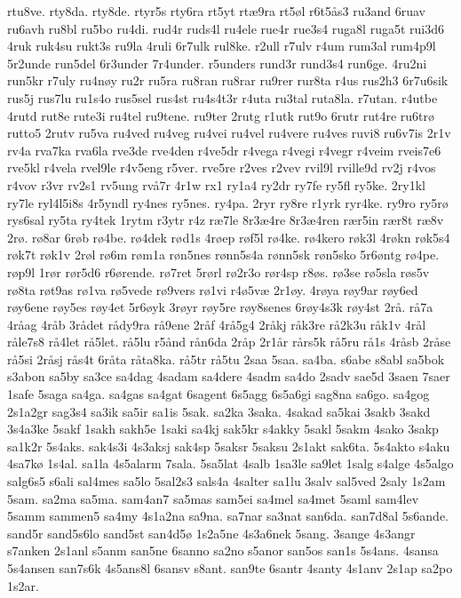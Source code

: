 {rtu8ve.
rty8da.
rty8de.
rtyr5s
rty6ra
rt5yt
rtæ9ra
rt5øl
r6t5ås3
ru3and
6ruav
ru6avh
ru8bl
ru5bo
ru4di.
rud4r
ruds4l
ru4ele
rue4r
rue3s4
ruga8l
ruga5t
rui3d6
4ruk
ruk4su
rukt3s
ru9la
4ruli
6r7ulk
rul8ke.
r2ull
r7ulv
r4um
rum3al
rum4p9l
5r2unde
run5del
6r3under
7r4under.
r5unders
rund3r
rund3s4
run6ge.
4ru2ni
run5kr
r7uly
ru4nøy
ru2r
ru5ra
ru8ran
ru8rar
ru9rer
rur8ta
r4us
rus2h3
6r7u6sik
rus5j
rus7lu
ru1s4o
rus5sel
rus4st
ru4s4t3r
r4uta
ru3tal
ruta8la.
r7utan.
r4utbe
4rutd
rut8e
rute3i
ru4tel
ru9tene.
ru9ter
2rutg
r1utk
rut9o
6rutr
rut4re
ru6trø
rutto5
2rutv
ru5va
ru4ved
ru4veg
ru4vei
ru4vel
ru4vere
ru4ves
ruvi8
ru6v7is
2r1v
rv4a
rva7ka
rva6la
rve3de
rve4den
r4ve5dr
r4vega
r4vegi
r4vegr
r4veim
rveis7e6
rve5kl
r4vela
rvel9le
r4v5eng
r5ver.
rve5re
r2ves
r2vev
rvil9l
rville9d
rv2j
r4vos
r4vov
r3vr
rv2s1
rv5ung
rvå7r
4r1w
rx1
ry1a4
ry2dr
ry7fe
ry5fl
ry5ke.
2ry1kl
ry7le
ryl4l5i8s
4r5yndl
ry4nes
ry5nes.
ry4pa.
2ryr
ry8re
r1yrk
ryr4ke.
ry9ro
ry5rø
rys6sal
ry5ta
ry4tek
1rytm
r3ytr
r4z
ræ7le
8r3æ4re
8r3æ4ren
rær5in
rær8t
ræ8v
2rø.
rø8ar
6røb
rø4be.
rø4dek
rød1s
4røep
røf5l
rø4ke.
rø4kero
røk3l
4røkn
røk5s4
røk7t
røk1v
2røl
rø6m
røm1a
røn5nes
rønn5s4a
rønn5sk
røn5sko
5r6øntg
rø4pe.
røp9l
1rør
rør5d6
r6ørende.
rø7ret
5rørl
rø2r3o
rør4sp
r8øs.
rø3se
rø5sla
røs5v
rø8ta
røt9as
rø1va
rø5vede
rø9vers
rø1vi
r4ø5væ
2r1øy.
4røya
røy9ar
røy6ed
røy6ene
røy5es
røy4et
5r6øyk
3røyr
røy5re
røy8senes
6røy4s3k
røy4st
2rå.
rå7a
4råag
4råb
3rådet
rådy9ra
rå9ene
2råf
4rå5g4
2råkj
råk3re
rå2k3u
råk1v
4rål
råle7s8
rå4let
rå5let.
rå5lu
r5ånd
rån6da
2råp
2r1år
rårs5k
rå5ru
rå1s
4råsb
2råse
rå5si
2råsj
rås4t
6råta
råta8ka.
rå5tr
rå5tu
2saa
5saa.
sa4ba.
s6abe
s8abl
sa5bok
s3abon
sa5by
sa3ce
sa4dag
4sadam
sa4dere
4sadm
sa4do
2sadv
sae5d
3saen
7saer
1safe
5saga
sa4ga.
sa4gas
sa4gat
6sagent
6s5agg
6s5a6gi
sag8na
sa6go.
sa4gog
2s1a2gr
sag3s4
sa3ik
sa5ir
sa1is
5sak.
sa2ka
3saka.
4sakad
sa5kai
3sakb
3sakd
3s4a3ke
5sakf
1sakh
sakh5e
1saki
sa4kj
sak5kr
s4akky
5sakl
5sakm
4sako
3sakp
sa1k2r
5s4aks.
sak4s3i
4s3aksj
sak4sp
5saksr
5saksu
2s1akt
sak6ta.
5s4akto
s4aku
4sa7kø
1s4al.
sa1la
4s5alarm
7sala.
5sa5lat
4salb
1sa3le
sa9let
1salg
s4alge
4s5algo
salg6s5
s6ali
sal4mes
sa5lo
5sal2s3
sals4a
4salter
sa1lu
3salv
sal5ved
2saly
1s2am
5sam.
sa2ma
sa5ma.
sam4an7
sa5mas
sam5ei
sa4mel
sa4met
5saml
sam4lev
5samm
sammen5
sa4my
4s1a2na
sa9na.
sa7nar
sa3nat
san6da.
san7d8al
5s6ande.
sand5r
sand5s6lo
sand5st
san4d5ø
1s2a5ne
4s3a6nek
5sang.
3sange
4s3angr
s7anken
2s1anl
s5anm
san5ne
6sanno
sa2no
s5anor
san5os
san1s
5s4ans.
4sansa
5s4ansen
san7s6k
4s5ans8l
6sansv
s8ant.
san9te
6santr
4santy
4s1anv
2s1ap
sa2po
1s2ar.
}
